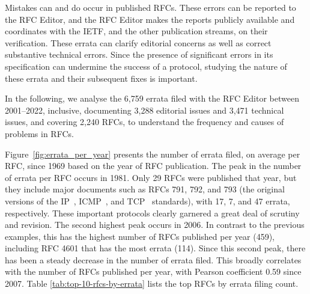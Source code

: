 \documentclass[twocolumn,10pt]{article}
\newcommand{\pb}[1]{\vspace{0.75ex}\noindent{\textbf{#1}}}
\begin{document}

Mistakes can and do occur in published RFCs.  These errors can be reported
to the RFC Editor, and the RFC Editor makes the reports publicly available
and coordinates with the IETF, and the other publication streams, on their
verification. These errata can clarify editorial concerns as well as correct
substantive technical errors. Since the presence of significant errors in
its specification can undermine the success of a protocol, studying the
nature of these errata and their subsequent fixes is important.

In the following, we analyse the 6,759 errata filed with the RFC Editor
between 2001–2022, inclusive, documenting 3,288 editorial issues and 3,471
technical issues, and covering 2,240 RFCs, to understand the frequency
and causes of problems in RFCs.


\pb{Errata over Time:}
Figure~\ref{fig:errata_per_year} presents the number of errata filed, on
average per RFC, since 1969 based on the year of RFC publication.  The peak
in the number of errata per RFC occurs in 1981. Only 29 RFCs were published
that year, but they include major documents such as RFCs 791, 792, and 793
(the original versions of the IP~\cite{RFC791}, ICMP~\cite{RFC792}, and
TCP~\cite{RFC793} standards), with 17, 7, and 47 errata, respectively.
These important protocols clearly garnered a great deal of scrutiny and
revision.  The second highest peak occurs in 2006.  In contrast to the
previous examples, this has the highest number of RFCs published per year
(459), including RFC 4601 \cite{RFC4601} that has the most errata (114).
Since this second peak, there has been a steady decrease in the number of
errata filed.  This broadly correlates with the number of RFCs published
per year, with Pearson coefficient 0.59 since 2007.
Table \ref{tab:top-10-rfcs-by-errata} lists the top RFCs by errata filing
count.
\end{document}
